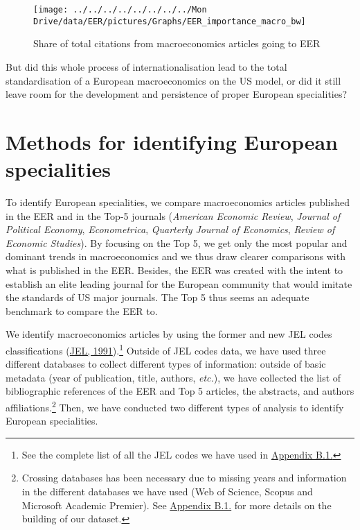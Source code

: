\documentclass[
  12pt,
  onecolumn]{article}
\begin{document}
\begin{figure}[h]

{\centering \texttt{[image: ../../../../../../../../Mon Drive/data/EER/pictures/Graphs/EER\_importance\_macro\_bw]} 

}

\caption{Share of total citations from macroeconomics articles going to EER}\label{fig:plot-eer-importance-macro}
\end{figure}

But did this whole process of internationalisation lead to the total
standardisation of a European macroeconomics on the US model, or did it
still leave room for the development and persistence of proper European
specialities?

\hypertarget{methods}{%
\section{Methods for identifying European specialities}\label{methods}}

To identify European specialities, we compare macroeconomics articles
published in the EER and in the Top-5 journals (\emph{American Economic
Review}, \emph{Journal of Political Economy}, \emph{Econometrica},
\emph{Quarterly Journal of Economics}, \emph{Review of Economic
Studies}). By focusing on the Top 5, we get only the most popular and
dominant trends in macroeconomics and we thus draw clearer comparisons
with what is published in the EER. Besides, the EER was created with the
intent to establish an elite leading journal for the European community
that would imitate the standards of US major journals. The Top 5 thus
seems an adequate benchmark to compare the EER to.

We identify macroeconomics articles by using the former and new JEL
codes classifications (\protect\hyperlink{ref-jel1991}{JEL,
1991}).\footnote{See the complete list of all the JEL codes we have used
  in \protect\hyperlink{eer-top5-macro}{Appendix B.1.}} Outside of JEL
codes data, we have used three different databases to collect different
types of information: outside of basic metadata (year of publication,
title, authors, \emph{etc.}), we have collected the list of
bibliographic references of the EER and Top 5 articles, the abstracts,
and authors affiliations.\footnote{Crossing databases has been necessary
  due to missing years and information in the different databases we
  have used (Web of Science, Scopus and Microsoft Academic Premier). See
  \protect\hyperlink{corpus}{Appendix B.1.} for more details on the
  building of our dataset.} Then, we have conducted two different types
of analysis to identify European specialities.
\end{document}
